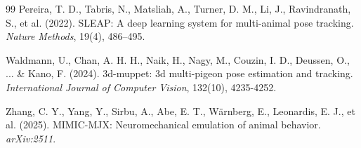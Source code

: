 \documentclass[pdflatex, sn-nature]{sn-jnl}
\theoremstyle{thmstyleone}%
\theoremstyle{thmstyletwo}%
\theoremstyle{thmstylethree}%
\begin{document}
\begin{thebibliography}{99}
 Pereira, T. D., Tabris, N., Matsliah, A., Turner, D. M., Li, J., Ravindranath, S., et al. (2022). SLEAP: A deep learning system for multi-animal pose tracking. \textit{Nature Methods}, 19(4), 486--495.

 Waldmann, U., Chan, A. H. H., Naik, H., Nagy, M., Couzin, I. D., Deussen, O., ... \& Kano, F. (2024). 3d-muppet: 3d multi-pigeon pose estimation and tracking. \textit{International Journal of Computer Vision}, 132(10), 4235-4252.

 Zhang, C. Y., Yang, Y., Sirbu, A., Abe, E. T., Wärnberg, E., Leonardis, E. J., et al. (2025). MIMIC-MJX: Neuromechanical emulation of animal behavior. \textit{arXiv:2511}.

\end{thebibliography}
\end{document}
